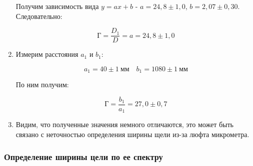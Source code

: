 \documentclass[a4paper, 12pt]{article}%
\begin{document}
\begin{enumerate}
Получим зависимость вида $y = ax + b$ - $a = 24,8 \pm 1,0$, $b = 2,07 \pm 0,30$. Следовательно:

\[\text{Г} = \frac{D_1}{D} = a = 24,8 \pm 1,0\]

\item Измерим расстояния $a_1$ и $b_1$:

\[a_1= 40\pm 1 \: \text{мм} \quad b_1 = 1080 \pm 1 \: \text{мм}\]

По ним получим:

\[\text{Г} = \frac{b_1}{a_1} = 27,0 \pm 0,7\]

\item Видим, что полученные значения немного отличаются, это может быть связано с неточностью определения ширины щели из-за люфта микрометра.

\end{enumerate}

\subsubsection*{Определение ширины цели по ее спектру}
\end{document}
